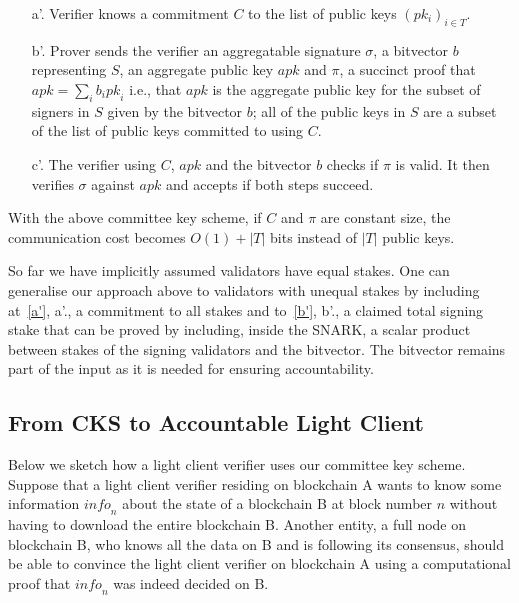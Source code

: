 \begin{itemize}
\item[a'.]\label{a'} Verifier knows a commitment $C$ to the list of public keys $(pk_i)_{i \in T}$.

\item[b'.]\label{b'} Prover sends the verifier an aggregatable signature $\sigma$, a bitvector $b$ representing $S$, an aggregate public key
$\mathit{apk}$ and $\pi$, a succinct proof that \\ $\mathit{apk}=\sum_i b_i \mathit{pk}_i$ i.e.,
that $\mathit{apk}$ is the aggregate public key for the subset of signers in $S$ given by the bitvector $b$; all of the public keys in $S$ are a subset
of the list of public keys committed to using $C$.

\item[c'.] The verifier using $C$, $\mathit{apk}$ and the bitvector $b$ checks if $\pi$ is valid.
It then verifies $\sigma$ against $\mathit{apk}$ and accepts if both steps succeed.
\end{itemize}

\noindent With the above committee key scheme, if $C$ and $\pi$ are constant size,
the communication cost becomes $O(1)+|T|$ bits instead of $|T|$ public keys.

So far we have implicitly assumed validators have equal stakes.
One can generalise our approach  above to validators with unequal stakes by including at~\ref{a'}, a'.,  a commitment to all stakes
and to~\ref{b'}, b'., a claimed total signing stake that can be proved by including, inside the SNARK, a scalar product between stakes of the signing validators and the bitvector.
The bitvector remains part of the input as it is needed for ensuring accountability.

\subsection{From CKS to Accountable Light Client}
\label{sec_intro_committee}

Below we sketch how a light client verifier uses our committee key scheme. Suppose that a light client verifier residing on 
blockchain A wants to know some information $\mathit{info}_n$ about the state of a blockchain B at block number $n$ without 
having to download the entire blockchain B. Another entity, a full node on blockchain B, who knows all the data on  
B and is following its consensus, should be able to convince the light client verifier on blockchain A using a computational 
proof that $\mathit{info}_n$ was indeed decided on B.

